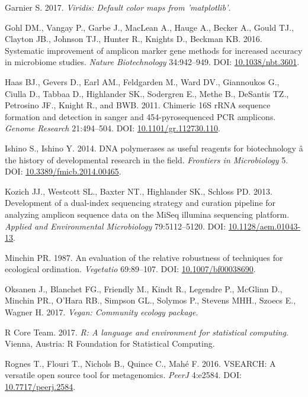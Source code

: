 \documentclass[12pt,]{article}
\begin{document}
\hypertarget{ref-viridis_citation_2017}{}
Garnier S. 2017. \emph{Viridis: Default color maps from 'matplotlib'}.

\hypertarget{ref-taq_Gohl_2016}{}
Gohl DM., Vangay P., Garbe J., MacLean A., Hauge A., Becker A., Gould
TJ., Clayton JB., Johnson TJ., Hunter R., Knights D., Beckman KB. 2016.
Systematic improvement of amplicon marker gene methods for increased
accuracy in microbiome studies. \emph{Nature Biotechnology} 34:942--949.
DOI: \href{https://doi.org/10.1038/nbt.3601}{10.1038/nbt.3601}.

\hypertarget{ref-Haas2011}{}
Haas BJ., Gevers D., Earl AM., Feldgarden M., Ward DV., Giannoukos G.,
Ciulla D., Tabbaa D., Highlander SK., Sodergren E., Methe B., DeSantis
TZ., Petrosino JF., Knight R., and BWB. 2011. Chimeric 16S rRNA sequence
formation and detection in sanger and 454-pyrosequenced PCR amplicons.
\emph{Genome Research} 21:494--504. DOI:
\href{https://doi.org/10.1101/gr.112730.110}{10.1101/gr.112730.110}.

\hypertarget{ref-polymerase_Ishino_2014}{}
Ishino S., Ishino Y. 2014. DNA polymerases as useful reagents for
biotechnology â the history of developmental research in the field.
\emph{Frontiers in Microbiology} 5. DOI:
\href{https://doi.org/10.3389/fmicb.2014.00465}{10.3389/fmicb.2014.00465}.

\hypertarget{ref-protocol_Kozich_2013}{}
Kozich JJ., Westcott SL., Baxter NT., Highlander SK., Schloss PD. 2013.
Development of a dual-index sequencing strategy and curation pipeline
for analyzing amplicon sequence data on the MiSeq illumina sequencing
platform. \emph{Applied and Environmental Microbiology} 79:5112--5120.
DOI: \href{https://doi.org/10.1128/aem.01043-13}{10.1128/aem.01043-13}.

\hypertarget{ref-bc_index_Minchin1987}{}
Minchin PR. 1987. An evaluation of the relative robustness of techniques
for ecological ordination. \emph{Vegetatio} 69:89--107. DOI:
\href{https://doi.org/10.1007/bf00038690}{10.1007/bf00038690}.

\hypertarget{ref-vegan_citation}{}
Oksanen J., Blanchet FG., Friendly M., Kindt R., Legendre P., McGlinn
D., Minchin PR., O'Hara RB., Simpson GL., Solymos P., Stevens MHH.,
Szoecs E., Wagner H. 2017. \emph{Vegan: Community ecology package}.

\hypertarget{ref-r_citation_2017}{}
R Core Team. 2017. \emph{R: A language and environment for statistical
computing}. Vienna, Austria: R Foundation for Statistical Computing.

\hypertarget{ref-vsearch_Rognes_2016}{}
Rognes T., Flouri T., Nichols B., Quince C., Mahé F. 2016. VSEARCH: A
versatile open source tool for metagenomics. \emph{PeerJ} 4:e2584. DOI:
\href{https://doi.org/10.7717/peerj.2584}{10.7717/peerj.2584}.
\end{document}
